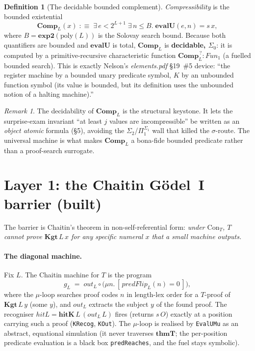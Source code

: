 \documentclass[11pt]{article}
\theoremstyle{plain}
\theoremstyle{definition}
\newtheorem{definition}[theorem]{Definition}
\theoremstyle{remark}
\newtheorem{remark}[theorem]{Remark}
\newcommand{\thmT}{\mathbf{thmT}}
\newcommand{\evalU}{\mathbf{evalU}}
\newcommand{\Con}{\mathrm{Con}_T}
\newcommand{\Kgt}{\mathbf{Kgt}}
\newcommand{\Comp}{\mathbf{Comp}}
\begin{document}
\begin{definition}[The decidable bounded complement]
\emph{Compressibility} is the bounded existential
\[
  \Comp_L(x) \;:\equiv\; \exists\, e < 2^{L+1}\;\exists\, n \le B.\;
  \evalU(e,n) = s\,x,
\]
where $B = \mathbf{exp2}(\mathrm{poly}(L))$ is the Solovay search bound. Because
both quantifiers are bounded and $\evalU$ is total, $\Comp_L$ is
\textbf{decidable, $\Sigma_0$}: it is computed by a primitive-recursive
characteristic function $\Comp_L^{\,?} : \mathit{Fun}_1$ (a fuelled bounded
search). This is exactly Nelson's \emph{elements.pdf} \S19~\#5 device: ``the
register machine by a bounded unary predicate symbol, $K$ by an unbounded
function symbol (its value is bounded, but its definition uses the unbounded
notion of a halting machine).''
\end{definition}

\begin{remark}
The decidability of $\Comp_L$ is the structural keystone. It lets the surprise-exam
invariant ``at least $j$ values are incompressible'' be written as an
\emph{object atomic} formula (\S5), avoiding the $\Sigma_2$/$\Pi_1^{\Sigma_1}$
wall that killed the $\sigma$-route. The universal machine is what makes
$\Comp_L$ a bona-fide bounded predicate rather than a proof-search surrogate.
\end{remark}

\section{Layer 1: the Chaitin G\"odel~I barrier (built)}

The barrier is Chaitin's theorem in non-self-referential form: \emph{under
$\Con$, $T$ cannot prove $\Kgt\,L\,x$ for any specific numeral $x$ that a small
machine outputs.}

\paragraph{The diagonal machine.} Fix $L$. The Chaitin machine for $T$ is the
program
\[
  g_L \;=\; \mathit{out}_L \circ \big(\mu n.\,[\,\mathit{predFlip}_L(n)=0\,]\big),
\]
where the $\mu$-loop searches proof codes $n$ in length-lex order for a $T$-proof
of $\Kgt\,L\,y$ (some $y$), and $\mathit{out}_L$ extracts the subject $y$ of the
found proof. The recogniser $\mathit{hitL} = \mathbf{hitK}\,L\,(\mathit{out}_L\,L)$
fires (returns $s\,O$) exactly at a position carrying such a proof
(\texttt{KRecog}, \texttt{KOut}). The $\mu$-loop is realised by \texttt{EvalUMu}
as an abstract, equational simulation (it never traverses $\thmT$; the per-position
predicate evaluation is a black box \texttt{predReaches}, and the fuel stays
symbolic).
\end{document}

